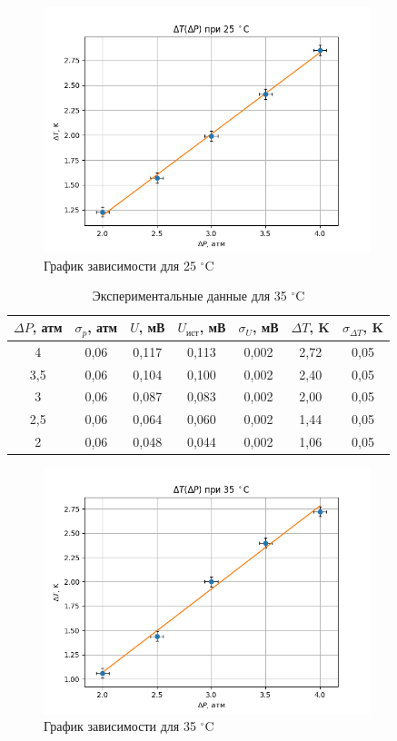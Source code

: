 \documentclass[a4paper,12pt]{article}
\begin{document}
\begin{figure}[H]
    \centering
    \includegraphics[width=0.85\textwidth]{2.png}
    \caption{График зависимости для 25 $^\circ$C}
\end{figure}

\begin{table}[!ht]
    \centering
    \begin{tabular}{|c|c|c|c|c|c|c|}
    \hline
        $ \Delta P $, атм & $ \sigma_p $, атм & $ U $, мВ & $ U_{ист} $, мВ &$ \sigma_U $, мВ & $ \Delta T $, K & $ \sigma_{\Delta T} $, K \\ \hline
        4 & 0,06 & 0,117 & 0,113 & 0,002 & 2,72 & 0,05  \\ \hline
        3,5 & 0,06 & 0,104 & 0,100 & 0,002 & 2,40 & 0,05  \\ \hline
        3 & 0,06 & 0,087 & 0,083 & 0,002 & 2,00 & 0,05  \\ \hline
        2,5 & 0,06 & 0,064 & 0,060 & 0,002 & 1,44 & 0,05  \\ \hline
        2 & 0,06 & 0,048 & 0,044 & 0,002 & 1,06 & 0,05 \\ \hline
    \end{tabular}
    \caption{Экспериментальные данные для 35 $^\circ$C}
\end{table}

\begin{figure}[!ht]
    \centering
    \includegraphics[width=0.85\textwidth]{3.png}
    \caption{График зависимости для 35 $^\circ$C}
\end{figure}
\end{document}
